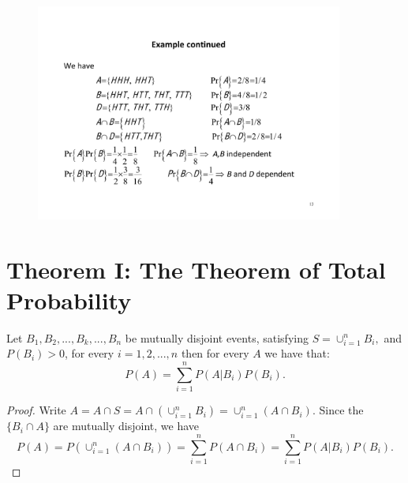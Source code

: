 \documentclass[notes=show,handout]{beamer}\usepackage[]{graphicx}\usepackage[]{color}
\begin{document}
\begin{frame}{\secname}
  \begin{example}[cont'd]
  \begin{figure}[h!]
  \centering
  \includegraphics[width=0.9\textwidth,height=0.6\textheight]{img/example8.pdf}
  \end{figure}
  \end{example}
\end{frame}


\section{Theorem I: The Theorem of Total Probability}

\begin{frame}{\secname}
  \begin{theorem}
  \label{Th:totprob}
  Let  $B_1,B_2,...,B_k,...,B_n$ be mutually disjoint events, satisfying
  $S=\cup_{i=1}^{n} B_i,$ and $P(B_i)>0$, for every $i=1,2,...,n$ then for every $A$ we have that:
  \begin{equation}
  \label{TP}
  P(A)=\sum_{i=1}^n P(A\vert B_i) P(B_i).
  \end{equation}
  \end{theorem}

  \begin{footnotesize}
  \begin{proof}
  Write $A=A\cap S = A\cap (\cup_{i=1}^{n} B_i) = \cup_{i=1}^{n} (A\cap B_i)$. Since the $\{B_i \cap A \}$ are mutually disjoint, we have
  \begin{equation*}
  P(A)=P\left(  \cup_{i=1}^{n} (A\cap B_i)  \right)=\sum_{i=1}^n P\left( A\cap B_i  \right ) =\sum_{i=1}^n P(A\vert B_i) P(B_i).
  \end{equation*}
  \end{proof}
  \end{footnotesize}
\end{frame}
\end{document}

